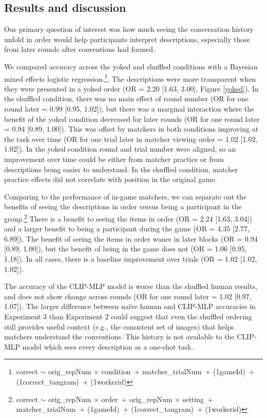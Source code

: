 \documentclass[10pt, letterpaper]{article}
\begin{document}
\subsection{Results and discussion}\label{results-and-discussion-1}

Our primary question of interest was how much seeing the conversation
history unfold in order would help participants interpret descriptions,
especially those from later rounds after conventions had formed.

We compared accuracy across the yoked and shuffled conditions with a
Bayesian mixed effects logistic regression.\footnote{correct \({\sim}\)
  orig\_repNum \({\times}\) condition~\({+}\) matcher\_trialNum~\({+}\)
  (1\textbar gameId)~\({+}\) (1\textbar correct\_tangram)~\({+}\)
  (1\textbar workerid)}. The descriptions were more transparent when
they were presented in a yoked order (OR = 2.20 {[}1.63, 3.00{]}, Figure
\ref{yoked}). In the shuffled condition, there was no main effect of
round number (OR for one round later = 0.99 {[}0.95, 1.02{]}), but there
was a marginal interaction where the benefit of the yoked condition
decreased for later rounds (OR for one round later = 0.94 {[}0.89,
1.00{]}). This was offset by matchers in both conditions improving at
the task over time (OR for one trial later in matcher viewing order =
1.02 {[}1.02, 1.02{]}). In the yoked condition round and trial number
were aligned, so an improvement over time could be either from matcher
practice or from descriptions being easier to understand. In the
shuffled condition, matcher practice effects did not correlate with
position in the original game.

Comparing to the performance of in-game matchers, we can separate out
the benefits of seeing the descriptions in order versus being a
participant in the group.\footnote{correct \({\sim}\) orig\_repNum
  \({\times}\) order~\({+}\) orig\_repNum \({\times}\) setting~\({+}\)
  matcher\_trialNum~\({+}\) (1\textbar gameId)~\({+}\)
  (1\textbar correct\_tangram)~\({+}\) (1\textbar workerid)} There is a
benefit to seeing the items in order (OR = 2.24 {[}1.63, 3.04{]}) and a
larger benefit to being a participant during the game (OR = 4.35
{[}2.77, 6.89{]}). The benefit of seeing the items in order wanes in
later blocks (OR = 0.94 {[}0.89, 1.00{]}), but the benefit of being in
the game does not (OR = 1.06 {[}0.95, 1.18{]}). In all cases, there is a
baseline improvement over trials (OR = 1.02 {[}1.02, 1.02{]}).

The accuracy of the CLIP-MLP model is worse than the shuffled human
results, and does not show change across rounds (OR for one round later
= 1.02 {[}0.97, 1.07{]}). The larger difference between naïve human and
CLIP-MLP accuracies in Experiment 3 than Experiment 2 could suggest that
even the shuffled ordering still provides useful context (e.g., the
consistent set of images) that helps matchers understand the
conventions. This history is not available to the CLIP-MLP model which
sees every description as a one-shot task.
\end{document}
